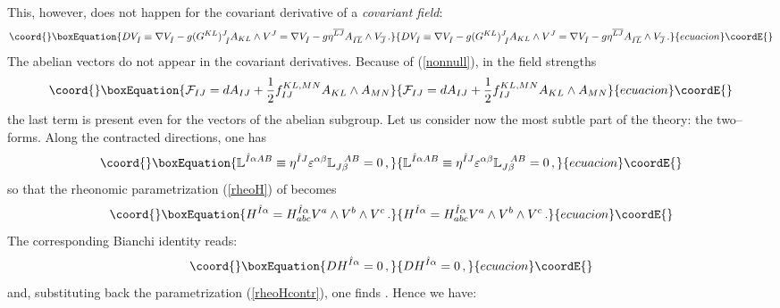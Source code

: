\documentclass[a4paper,12pt]{article}
\def\bar{\overline}\end {picture}}
\begin{document}
This, however, does not happen for the covariant derivative of a
{\sl covariant field}:
\begin{equation}\coord{}\boxEquation{
DV_{\hat{I}} \equiv \nabla
V_{\hat{I}}-g(G^{KL})^J_{~\hat{I}}A_{KL}\wedge V^J= \nabla
V_{\hat{I}}-g\eta^{\bar{L}\bar{J}}A_{\hat{I}\bar{L}}\wedge
V_{\bar{J}}\,.
}{
DV_{\hat{I}} \equiv \nabla
V_{\hat{I}}-g(G^{KL})^J_{~\hat{I}}A_{KL}\wedge V^J= \nabla
V_{\hat{I}}-g\eta^{\bar{L}\bar{J}}A_{\hat{I}\bar{L}}\wedge
V_{\bar{J}}\,.
}{ecuacion}\coordE{}\end{equation}
The abelian vectors \coordHE{} do not appear in the
covariant derivatives. Because of (\ref{nonnull}), in the field
strengths
\begin{equation}\coord{}\boxEquation{
\mathcal{F}_{IJ}=dA_{IJ}+{1\over 2}f^{KL,MN}_{IJ}A_{KL}\wedge
A_{MN}
}{
\mathcal{F}_{IJ}=dA_{IJ}+{1\over 2}f^{KL,MN}_{IJ}A_{KL}\wedge
A_{MN}
}{ecuacion}\coordE{}\end{equation}
the last term is present even for the vectors of the abelian
subgroup. Let us consider now the most subtle part of the theory:
the two--forms. Along the contracted directions, one has
\begin{equation}\coord{}\boxEquation{
\mathbb{L}^{\hat{I}\alpha AB}\equiv
\eta^{\hat{I}J}\varepsilon^{\alpha\beta}\mathbb{L}_{J\beta}^{~~AB}=0\,,
}{
\mathbb{L}^{\hat{I}\alpha AB}\equiv
\eta^{\hat{I}J}\varepsilon^{\alpha\beta}\mathbb{L}_{J\beta}^{~~AB}=0\,,
}{ecuacion}\coordE{}\end{equation}
so that the rheonomic parametrization (\ref{rheoH}) of
\coordHE{} becomes
\begin{equation}\coord{}\boxEquation{
H^{\hat{I}\alpha}=H^{\hat{I}\alpha}_{abc}V^a\wedge V^b\wedge
V^c\,. \label{rheoHcontr}
}{
H^{\hat{I}\alpha}=H^{\hat{I}\alpha}_{abc}V^a\wedge V^b\wedge
V^c\,. }{ecuacion}\coordE{}\end{equation}
The corresponding Bianchi identity reads:
\begin{equation}\coord{}\boxEquation{
DH^{\hat{I}\alpha}=0\,,
}{
DH^{\hat{I}\alpha}=0\,,
}{ecuacion}\coordE{}\end{equation}
and, substituting  back the parametrization (\ref{rheoHcontr}),
one finds
 \coordHE{}. Hence we have:
\end{document}
